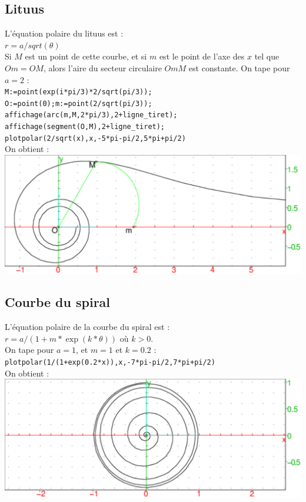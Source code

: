 \documentclass[a4paper,11pt]{book}
\begin{document}
\subsection{Lituus}
L'\'equation polaire du lituus est :\\
$r=a/sqrt(\theta)$\\
Si $M$ est un point de cette courbe, et si $m$ est le point de l'axe des $x$ 
tel que $Om=OM$, alors l'aire du secteur circulaire $OmM$ est constante.
On tape pour $a=2$ :\\
{\tt M:=point(exp(i*pi/3)*2/sqrt(pi/3));}\\
{\tt O:=point(0);m:=point(2/sqrt(pi/3));}\\
{\tt affichage(arc(m,M,2*pi/3),2+ligne\_tiret);}\\
{\tt affichage(segment(O,M),2+ligne\_tiret);}\\
{\tt plotpolar(2/sqrt(x),x,-5*pi-pi/2,5*pi+pi/2)}\\
On obtient :\\
\includegraphics[width=\textwidth]{spiral6}
\subsection{Courbe du spiral}
L'\'equation polaire de la courbe du spiral est :\\
$r=a/(1+m*\exp(k*\theta))$ o\`u $k>0$.\\
On tape pour $a=1$, et $m=1$ et $k=0.2$ :\\
{\tt plotpolar(1/(1+exp(0.2*x)),x,-7*pi-pi/2,7*pi+pi/2)}\\
On obtient :\\
\includegraphics[width=\textwidth]{spiral9}
\end{document}
